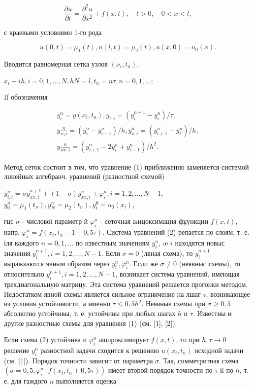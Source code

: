 \documentclass[10pt]{article}
\begin{document}
\[
\frac{\partial u}{\partial t}=\frac{\partial^{2} u}{\partial x^{2}}+f(x, t), \quad t>0, \quad 0<x<l,
\]

с краевыми условиями 1-го рода

\[
u(0, t)=\mu_{1}(t), u(l, t)=\mu_{2}(t), u(x, 0)=u_{0}(x) .
\]

Вводится равномерная сетка узлов $\left(x_{i}, t_{n}\right)$,

$x_{i}-i h, i=0,1, \ldots, N, h N=l, t_{n}=n \tau, n=0,1, \ldots ;$

If обозначения

\[
\begin{gathered}
y_{i}^{n}=y\left(x_{i}, t_{n}\right), y_{t, i}=\left(y_{i}^{n+1}-y_{i}^{n}\right) / \tau, \\
y \frac{n}{x_{1} i}=\left(y_{i}^{n}-y_{i-1}^{n}\right) / h, y_{x, i}^{n}=\left(y_{i+1}^{n}-y_{i}^{n}\right) / h, \\
y \frac{n}{x x, i}=\left(y_{i+1}^{n}-2 y_{i}^{n}+y_{i-1}^{n}\right) / h^{2} .
\end{gathered}
\]

Метод сеток состоит в том, что уравнение (1) приближенно заменяется системой линейных алгебраич. уравнений (разностной схемой)

$y_{t, i}^{n}=\sigma y_{\bar{x} x, i}^{n+1}+(1-\sigma) y_{\bar{x} x, i}^{n}+\varphi_{i}^{n}, i=1,2, \ldots, N-1$,
$y_{0}^{n}=\mu_{1}\left(t_{n}\right), y_{N}^{n}=\mu_{2}\left(t_{n}\right), y_{i}^{0}=u_{0}\left(x_{i}\right)$,

гцс $\sigma$ - числової параметр й $\varphi_{i}^{n}$ - сеточная аıицоксимация фұункции $f(x, t)$, напр. $\varphi_{i}^{n}=f\left(x_{i}, t_{n}-1-0,5 \tau\right)$. Система уравнений (2) репается по слоям, т. е. іля каждого $n=0,1, \ldots$ по известным значениям $y_{i}^{n}$, œ $i$ находятся новыс значения $y_{i}^{n+1}, i=1,2, \ldots, N-1$. Если $\sigma=0$ (лвная схема), то $y_{i}^{n+1}$ выражкаются явным образом через $y_{i}^{n}, \varphi_{i}^{n}$. Если же $\sigma \neq 0$ (неявныс схемы), то относительно $y_{i}^{n+1}, i=1,2, \ldots, N-1$, возникает система уравнений, имеющая трехдиагональную матрицу. Эта система уравнений решается прогонки методом. Недостатком явной схемы является сильное ограничение на лшаг $\tau$, возникающее из условия устойчивости, а именно $\tau \leqslant 0,5 h^{2}$. Неявные схемы при $\sigma \geqslant 0,5$ абсолютно устойчивы, т. е. устойчивы при любых шагах $h$ и $\tau$. Известны и другие разностные схемы для уравнения (1) (см. [1], [2]).

Если схема (2) устойчива и $\varphi_{i}^{n}$ ашпроксимирует $f(x, t)$, то при $h, \tau \rightarrow 0$ решение $y_{i}^{n}$ разностной задачи сходится к решению $u\left(x_{i}, t_{n}\right)$ исходной задачи (см. [1]). Порядок точности зависит от параметра $\sigma$. Так, симметритная схема $\left(\sigma=0,5, \varphi_{i}^{n} \cdot f\left(x_{i}, t_{n}+0,5 \tau\right)\right)$ имеет второй порядок точности по $\tau$ іl по $h$, т. е. для гаждого $n$ выполняется оценка
\end{document}
